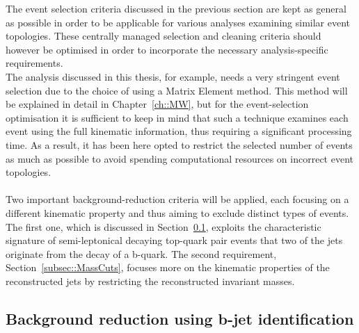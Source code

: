 The event selection criteria discussed in the previous section are kept as general as possible in order to be applicable for various analyses examining similar event topologies.
These centrally managed selection and cleaning criteria should however be optimised in order to incorporate the necessary analysis-specific requirements.
\\
The analysis discussed in this thesis, for example, needs a very stringent event selection due to the choice of using a Matrix Element method.
This method will be explained in detail in Chapter~\ref{ch::MW}, but for the event-selection optimisation it is sufficient to keep in mind that such a technique examines each event using the full kinematic information, thus requiring a significant processing time. As a result, it has been here opted to restrict the selected number of events as much as possible to avoid spending computational resources on incorrect event topologies.
\\
\\
Two important background-reduction criteria will be applied, each focusing on a different kinematic property and thus aiming to exclude distinct types of events. 
The first one, which is discussed in Section~\ref{subsec::BTag}, exploits the characteristic signature of semi-leptonical decaying top-quark pair events that two of the jets originate from the decay of a b-quark. The second requirement, Section~\ref{subsec::MassCuts}, focuses more on the kinematic properties of the reconstructed jets by restricting the reconstructed invariant masses.

\subsection{Background reduction using b-jet identification}\label{subsec::BTag}

